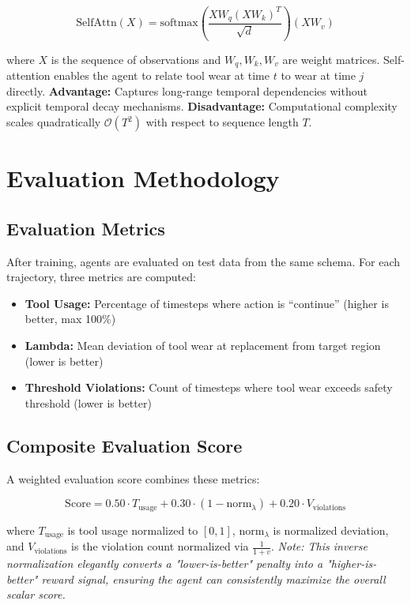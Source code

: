\documentclass[11pt]{article}
\begin{document}
\begin{equation}
\mathrm{SelfAttn}(X) = \mathrm{softmax}\left( \frac{X W_q (X W_k)^T}{\sqrt{d}} \right) (X W_v)
\end{equation}

where $X$ is the sequence of observations and $W_q, W_k, W_v$ are weight matrices. Self-attention enables the agent to relate tool wear at time $t$ to wear at time $j$ directly.
\textbf{Advantage:} Captures long-range temporal dependencies without explicit temporal decay mechanisms.
\textbf{Disadvantage:} Computational complexity scales quadratically $\mathcal{O}(T^2)$ with respect to sequence length $T$.

\section{Evaluation Methodology}

\subsection{Evaluation Metrics}
After training, agents are evaluated on test data from the same schema. For each trajectory, three metrics are computed:
\begin{itemize}
\item \textbf{Tool Usage:} Percentage of timesteps where action is ``continue'' (higher is better, max 100\%)
\item \textbf{Lambda:} Mean deviation of tool wear at replacement from target region (lower is better)
\item \textbf{Threshold Violations:} Count of timesteps where tool wear exceeds safety threshold (lower is better)
\end{itemize}

\subsection{Composite Evaluation Score}
A weighted evaluation score combines these metrics:

\begin{equation}
\mathrm{Score} = 0.50 \cdot T_{\mathrm{usage}} + 0.30 \cdot (1 - \mathrm{norm}_{\lambda}) + 0.20 \cdot V_{\mathrm{violations}}
\end{equation}

where $T_{\mathrm{usage}}$ is tool usage normalized to $[0, 1]$, $\mathrm{norm}_{\lambda}$ is normalized deviation, and $V_{\mathrm{violations}}$ is the violation count normalized via $\frac{1}{1+v}$. \textit{Note: This inverse normalization elegantly converts a "lower-is-better" penalty into a "higher-is-better" reward signal, ensuring the agent can consistently maximize the overall scalar score.}
\end{document}
